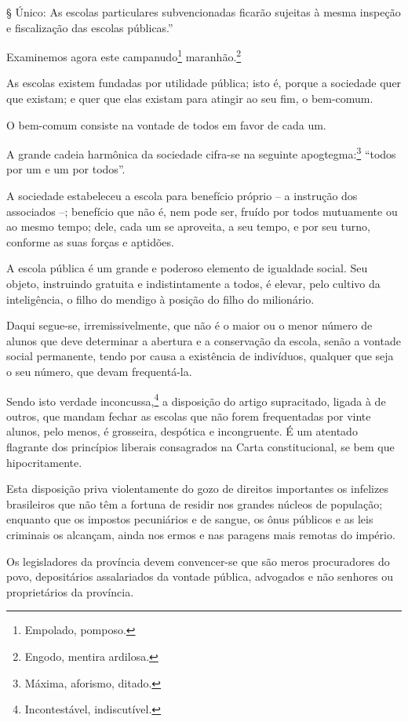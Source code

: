 § Único: As escolas particulares subvencionadas ficarão sujeitas à mesma
inspeção e fiscalização das escolas públicas.''

Examinemos agora este campanudo\footnote{Empolado, pomposo.}
maranhão.\footnote{Engodo, mentira ardilosa.}

As escolas existem fundadas por utilidade pública; isto é, porque a
sociedade quer que existam; e quer que elas existam para atingir ao seu
fim, o bem-comum.

O bem-comum consiste na vontade de todos em favor de cada um.

A grande cadeia harmônica da sociedade cifra-se na seguinte
apogtegma:\footnote{Máxima, aforismo, ditado.} ``todos por um e um por
todos''.

A sociedade estabeleceu a escola para benefício próprio -- a instrução
dos associados --; benefício que não é, nem pode ser, fruído por todos
mutuamente ou ao mesmo tempo; dele, cada um se aproveita, a seu tempo, e
por seu turno, conforme as suas forças e aptidões.

A escola pública é um grande e poderoso elemento de igualdade social.
Seu objeto, instruindo gratuita e indistintamente a todos, é elevar,
pelo cultivo da inteligência, o filho do mendigo à posição do filho do
milionário.

Daqui segue-se, irremissivelmente, que não é o maior ou o menor número
de alunos que deve determinar a abertura e a conservação da escola,
senão a vontade social permanente, tendo por causa a existência de
indivíduos, qualquer que seja o seu número, que devam frequentá-la.

Sendo isto verdade inconcussa,\footnote{Incontestável, indiscutível.}
a disposição do artigo supracitado, ligada à de outros, que mandam
fechar as escolas que não forem frequentadas por vinte alunos, pelo
menos, é grosseira, despótica e incongruente. É um atentado flagrante
dos princípios liberais consagrados na Carta constitucional, se bem que
hipocritamente.

Esta disposição priva violentamente do gozo de direitos importantes os
infelizes brasileiros que não têm a fortuna de residir nos grandes
núcleos de população; enquanto que os impostos pecuniários e de sangue,
os ônus públicos e as leis criminais os alcançam, ainda nos ermos e nas
paragens mais remotas do império.

Os legisladores da província devem convencer-se que são meros
procuradores do povo, depositários assalariados da vontade pública,
advogados e não senhores ou proprietários da província.

